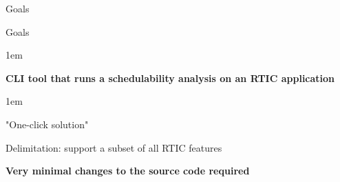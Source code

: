 \begin{frame}{Goals}
    \begin{block}{Goals}
        \begin{itemize-size}{1em}
            \item \textbf{CLI tool that runs a schedulability analysis on an RTIC application}
                \vspace{0.5em}
                \begin{itemize-size}{1em}
                    \item "One-click solution" 
                    \item Delimitation: support a subset of all RTIC features
                \end{itemize-size}
            \item \textbf{Very minimal changes to the source code required}
        \end{itemize-size}          
    \end{block}
\end{frame}
